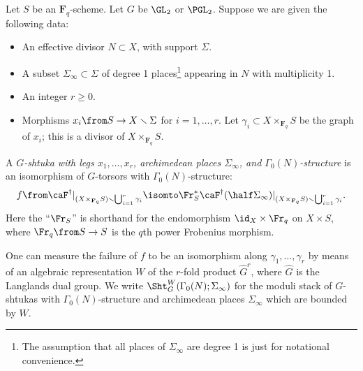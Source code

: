 \documentclass{article}
\def\F{\mathbf{F}}
\begin{document}
\begin{defn} \label{DefnShtuka} Let $S$ be an $\F_q$-scheme.  Let $G$ be $\GL_2$ or $\PGL_2$.  Suppose we are given the following data:
\begin{itemize}
\item An effective divisor $N\subset X$, with support $\Sigma$.
\item A subset $\Sigma_\infty \subset \Sigma$ of degree 1 places\footnote{The assumption that all places of $\Sigma_\infty$ are degree 1 is just for notational convenience.} appearing in $N$ with multiplicity 1.
\item An integer $r\geq 0$.
\item Morphisms $x_i\from S\to X\smallsetminus \Sigma$ for $i=1,\dots,r$.  Let $\gamma_i\subset X\times_{\F_q} S$ be the graph of $x_i$;  this is a divisor of $X\times_{\F_q} S$.
\end{itemize}  
A {\em $G$-shtuka with legs $x_1,\dots,x_r$, archimedean places $\Sigma_\infty$, and $\Gamma_0(N)$-structure} is an isomorphism of $G$-torsors with $\Gamma_0(N)$-structure:
\[ f\from \caF^\dagger\vert_{(X\times_{\F_q} S) \smallsetminus \bigcup_{i=1}^r \gamma_i } \isomto \Fr_S^*\caF^\dagger(\half \Sigma_\infty)\vert_{(X\times_{\F_q} S) \smallsetminus \bigcup_{i=1}^r \gamma_i }. \]
Here the ``$\Fr_S$'' is shorthand for the endomorphism $\id_X\times \Fr_q$ on $X\times S$, where $\Fr_q\from S\to S$ is the $q$th power Frobenius morphism.
\end{defn}  
One can measure the failure of $f$ to be an isomorphism along $\gamma_1,\dots,\gamma_r$ by means of an algebraic representation $W$ of the $r$-fold product $\hat{G}^r$, where $\hat{G}$ is the Langlands dual group.   We write $\Sht^W_G(\Gamma_0(N);\Sigma_\infty)$ for the moduli stack of $G$-shtukas with $\Gamma_0(N)$-structure and archimedean places $\Sigma_\infty$ which are bounded by $W$.  





\end{document}
